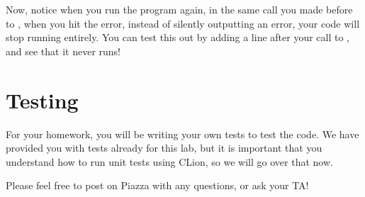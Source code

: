 \documentclass{tufte-handout}
\begin{document}
Now, notice when you run the program again, in the same call you made before to , when you hit the error, instead of silently outputting an error, your code will stop running entirely.  
You can test this out by adding a  line after your call to , and see that it never runs! 

\section{Testing}


For your homework, you will be writing your own tests to test the code.  We have provided you with tests already for this lab, but it is important that you understand how to run unit tests using CLion, so we will go over that now.


Please feel free to post on Piazza with any questions, or ask your TA!  
\end{document}
